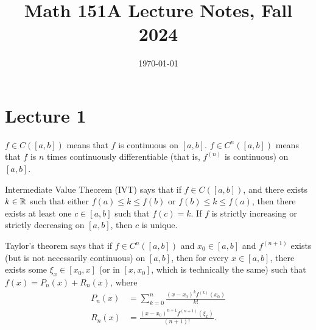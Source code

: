 \documentclass{article}
\date{\today}
\title{Math 151A Lecture Notes, Fall 2024}
\begin{document}
\maketitle

\tableofcontents

\section{Lecture 1}
$f \in C([a, b])$ means that $f$ is continuous on $[a,b]$. $f \in C^n([a,b])$ means that $f$ is $n$ times continuously differentiable (that is, $f^{(n)}$ is continuous) on $[a, b]$.
\par
Intermediate Value Theorem (IVT) says that if $f \in C([a,b])$, and there exists $k \in \mathbb{R}$ such that either $f(a) \leq k \leq f(b)$ or $f(b) \leq k \leq f(a)$, then there exists at least one $c \in [a,b]$ such that $f(c)=k$. If $f$ is strictly increasing or strictly decreasing on $[a,b]$, then $c$ is unique.
\par
Taylor's theorem says that if $f \in C^n([a,b])$ and $x_0 \in [a,b]$ and $f^{(n+1)}$ exists (but is not necessarily continuous) on $[a,b]$, then for every $x \in [a,b]$, there exists some $\xi_x \in [x_0, x]$ (or in $[x, x_0]$, which is technically the same) such that $f(x) = P_n(x) + R_n(x)$, where
\begin{align*}
    P_n(x) &= \sum_{k=0}^n \frac{(x-x_0)^k f^{(k)}(x_0)}{k!} \\
    R_n(x) &= \frac{(x-x_0)^{n+1}f^{(n+1)}(\xi_x)}{(n+1)!}.
\end{align*}
\end{document}
